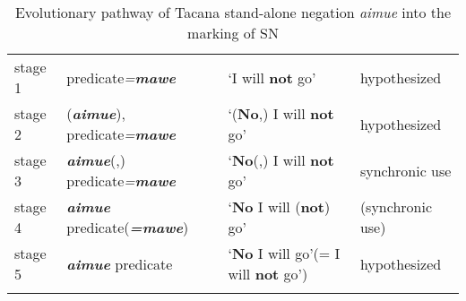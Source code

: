 \documentclass[output=paper]{langsci/langscibook}
\begin{document}
\begin{table}\begin{small}\caption{Evolutionary pathway of Tacana stand-alone negation
\emph{aimue} into the marking of SN}\label{tab:tacana-aimue-pathway}
\begin{tabularx}{\textwidth}{l l Q l}
\lsptoprule
stage 1 & predicate\textit{=\textbf{mawe}} & `I will \textbf{not} go' & hypothesized\\
stage 2 & (\textbf{\textit{aimue}}), predicate\textit{=\textbf{mawe}} & `(\textbf{No},) I will \textbf{not} go' & hypothesized\\
stage 3 & \textbf{\textit{aimue}}(,) predicate\textit{=\textbf{mawe}} & `\textbf{No}(,) I will \textbf{not} go' & synchronic use\\
stage 4 & \textbf{\textit{aimue}} predicate(\textbf{\textit{=mawe}}) & `\textbf{No} I will (\textbf{not}) go' & (synchronic use)\\
stage 5 & \textbf{\textit{aimue}} predicate & `\textbf{No} I will
go'\newline (= I will \textbf{not} go') & hypothesized\\
\lspbottomrule
\end{tabularx}\end{small}\end{table}

\end{document}
